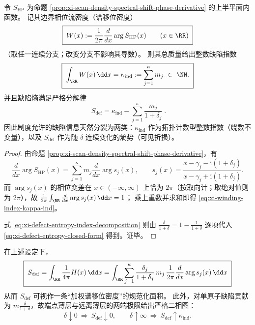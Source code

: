 \begin{proposition}\label{prop:xi-index-entropy-decomposition}
令 \(S_{\mathrm{HP}}\) 为命题 \ref{prop:xi-scan-density-spectral-shift-phase-derivative} 的上半平面内函数。
记其边界相位流密度（谱移位密度）
\begin{equation}\label{eq:xi-spectral-shift-density-W}
\boxed{\;
W(x):=\frac{1}{2\pi}\frac{d}{dx}\arg S_{\mathrm{HP}}(x)\qquad(x\in\RR)\;}
\end{equation}
（取任一连续分支；改变分支不影响其导数）。
则其总质量给出整数缺陷指数
\begin{equation}\label{eq:xi-winding-index-kappa-ind}
\boxed{\;
\int_{\RR}W(x)\,\dd x=\kappa_{\mathrm{ind}}:=\sum_{j=1}^{\kappa}m_j\ \in\ \NN.\;}
\end{equation}
并且缺陷熵满足严格分解律
\begin{equation}\label{eq:xi-defect-entropy-index-decomposition}
\boxed{\;
S_{\mathrm{def}}
=\kappa_{\mathrm{ind}}-\sum_{j=1}^{\kappa}\frac{m_j}{1+\delta_j}\; }.
\end{equation}
因此制度允许的缺陷信息天然分裂为两类：\(\kappa_{\mathrm{ind}}\) 作为拓扑计数型整数指数（绕数不变量），以及 \(S_{\mathrm{def}}\) 作为随 \(\delta\) 连续变化的熵势（可见折损）。
\end{proposition}

\begin{proof}
由命题 \ref{prop:xi-scan-density-spectral-shift-phase-derivative}，有
\[
\frac{d}{dx}\arg S_{\mathrm{HP}}(x)
=\sum_{j=1}^{\kappa}m_j\frac{d}{dx}\arg s_j(x),
\qquad
s_j(x)=\frac{x-\gamma_j-\mathrm{i}(1+\delta_j)}{x-\gamma_j+\mathrm{i}(1+\delta_j)}.
\]
而 \(\arg s_j(x)\) 的相位变差在 \(x\in(-\infty,\infty)\) 上恰为 \(2\pi\)（按取向计；取绝对值则为 \(2\pi\)），故
\(
\frac{1}{2\pi}\int_{\RR}\frac{d}{dx}\arg s_j(x)\,\dd x=1
\)；
乘上重数并求和即得 \eqref{eq:xi-winding-index-kappa-ind}。
\par
式 \eqref{eq:xi-defect-entropy-index-decomposition} 则由
\(
\frac{\delta}{1+\delta}=1-\frac{1}{1+\delta}
\)
逐项代入 \eqref{eq:xi-defect-entropy-closed-form} 得到。证毕。
\end{proof}

\begin{corollary}\label{cor:xi-defect-entropy-area-law-phase-diagram}
在上述设定下，
\[
\boxed{\;
S_{\mathrm{def}}
=\int_{\RR}\frac{1}{4\pi}H(x)\,\dd x
=\int_{\RR}\sum_{j=1}^{\kappa}\frac{\delta_j}{1+\delta_j}\,m_j\,
\frac{1}{2\pi}\frac{d}{dx}\arg s_j(x)\,\dd x\;}
\]
从而 \(S_{\mathrm{def}}\) 可视作一条“加权谱移位密度”的规范化面积。
此外，对单原子缺陷贡献为 \(m\frac{\delta}{1+\delta}\)，故端点薄层与远离薄层的两端极限给出严格二相图：
\[
\boxed{\;
\delta\downarrow 0\ \Longrightarrow\ S_{\mathrm{def}}\downarrow 0,\qquad
\delta\uparrow\infty\ \Longrightarrow\ S_{\mathrm{def}}\uparrow \kappa_{\mathrm{ind}}.\;}
\]
\end{corollary}

